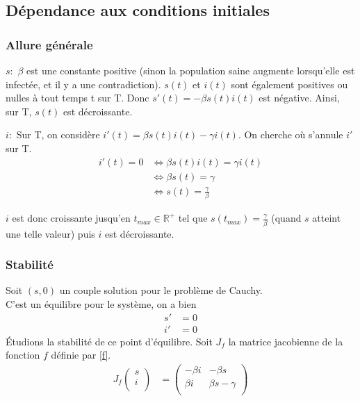 \documentclass[a4paper]{article}
\theoremstyle{plain}
\theoremstyle{definition}
\theoremstyle{remark}
\begin{document}
    
  \subsection{Dépendance aux conditions initiales}
  \subsubsection{Allure générale}
    \begin{description}
    \item{$s:  $} $\beta$ est une constante positive (sinon la population saine augmente lorsqu'elle est infectée, et il y a une contradiction). $s(t)$ et $i(t)$ sont également positives ou nulles à tout temps t sur T. Donc $s'(t)= -\beta s(t)i(t)$ est négative. Ainsi, sur T, $s(t)$ est décroissante. %
    \item{$i:  $} Sur T, on considère $i'(t)=\beta s(t)i(t) -\gamma i(t)$. On cherche où s'annule $i'$ sur T. 
    \begin{align*}
    i'(t)=0 &\Leftrightarrow \beta s(t)i(t)=\gamma i(t)\\
    &\Leftrightarrow \beta s(t)=\gamma\\
    &\Leftrightarrow s(t)=\frac{\gamma}{\beta}
    \end{align*}
	\end{description}
 $i$ est donc croissante jusqu'en $t_{max}\in\mathbb{R}^+$ tel que $s(t_{max})=\frac{\gamma}{\beta}$ (quand $s$ atteint une telle valeur) puis $i$ est décroissante.\\
\subsubsection{Stabilité}
 	Soit $(s,0)$ un couple solution pour le problème de Cauchy.\\
 	C'est un équilibre pour le système, on a bien 
 	\begin{align*}
    s' &= 0\\
    i' &= 0
    \end{align*}
 	Étudions la stabilité de ce point d'équilibre. Soit $J_f$ la matrice jacobienne de la fonction $f$ définie par \eqref{f}.
 	\begin{align}
 J_f\begin{pmatrix}
s\\ i\\
\end{pmatrix}
&=\begin{pmatrix}
-\beta i&-\beta s\\
\beta i&\beta s-\gamma\\
\end{pmatrix} 
\end{align}
\end{document}
